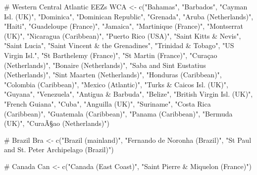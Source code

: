 \documentclass[
]{article}
\newenvironment{Shaded}{\begin{snugshade}}{\end{snugshade}}
\newcommand{\CommentTok}[1]{\textcolor[rgb]{0.37,0.37,0.37}{#1}}
\newcommand{\FunctionTok}[1]{\textcolor[rgb]{0.28,0.35,0.67}{#1}}
\newcommand{\NormalTok}[1]{\textcolor[rgb]{0.00,0.23,0.31}{#1}}
\newcommand{\OtherTok}[1]{\textcolor[rgb]{0.00,0.23,0.31}{#1}}
\newcommand{\StringTok}[1]{\textcolor[rgb]{0.13,0.47,0.30}{#1}}
\begin{document}
\begin{Shaded}
\begin{Highlighting}[]
\CommentTok{\# Western Central Atlantic EEZs}
\NormalTok{WCA }\OtherTok{\textless{}{-}} \FunctionTok{c}\NormalTok{(}\StringTok{"Bahamas"}\NormalTok{, }\StringTok{"Barbados"}\NormalTok{, }\StringTok{"Cayman Isl. (UK)"}\NormalTok{, }\StringTok{"Dominica"}\NormalTok{, }\StringTok{"Dominican Republic"}\NormalTok{, }\StringTok{"Grenada"}\NormalTok{, }
         \StringTok{"Aruba (Netherlands)"}\NormalTok{, }\StringTok{"Haiti"}\NormalTok{, }\StringTok{"Guadeloupe  (France)"}\NormalTok{, }\StringTok{"Jamaica"}\NormalTok{, }\StringTok{"Martinique (France)"}\NormalTok{,}
         \StringTok{"Montserrat (UK)"}\NormalTok{, }\StringTok{"Nicaragua (Caribbean)"}\NormalTok{, }\StringTok{"Puerto Rico (USA)"}\NormalTok{, }\StringTok{"Saint Kitts \& Nevis"}\NormalTok{, }
         \StringTok{"Saint Lucia"}\NormalTok{, }\StringTok{"Saint Vincent \& the Grenadines"}\NormalTok{, }\StringTok{"Trinidad \& Tobago"}\NormalTok{, }\StringTok{"US Virgin Isl."}\NormalTok{, }
         \StringTok{"St Barthelemy (France)"}\NormalTok{, }\StringTok{"St Martin (France)"}\NormalTok{, }\StringTok{"Curaçao (Netherlands)"}\NormalTok{, }\StringTok{"Bonaire (Netherlands)"}\NormalTok{,}
         \StringTok{"Saba and Sint Eustatius (Netherlands)"}\NormalTok{, }\StringTok{"Sint Maarten (Netherlands)"}\NormalTok{, }\StringTok{"Honduras (Caribbean)"}\NormalTok{,}
         \StringTok{"Colombia (Caribbean)"}\NormalTok{, }\StringTok{"Mexico (Atlantic)"}\NormalTok{, }\StringTok{"Turks \& Caicos Isl. (UK)"}\NormalTok{, }\StringTok{"Guyana"}\NormalTok{, }\StringTok{"Venezuela"}\NormalTok{,}
         \StringTok{"Antigua \& Barbuda"}\NormalTok{, }\StringTok{"Belize"}\NormalTok{, }\StringTok{"British Virgin Isl. (UK)"}\NormalTok{, }\StringTok{"French Guiana"}\NormalTok{, }\StringTok{"Cuba"}\NormalTok{, }
         \StringTok{"Anguilla (UK)"}\NormalTok{, }\StringTok{"Suriname"}\NormalTok{, }\StringTok{"Costa Rica (Caribbean)"}\NormalTok{, }\StringTok{"Guatemala (Caribbean)"}\NormalTok{, }
         \StringTok{"Panama (Caribbean)"}\NormalTok{, }\StringTok{"Bermuda (UK)"}\NormalTok{, }\StringTok{"CuraÃ§ao (Netherlands)"}\NormalTok{) }
           
\CommentTok{\# Brazil}
\NormalTok{Bra }\OtherTok{\textless{}{-}} \FunctionTok{c}\NormalTok{(}\StringTok{"Brazil (mainland)"}\NormalTok{, }\StringTok{"Fernando de Noronha (Brazil)"}\NormalTok{, }
         \StringTok{"St Paul and St. Peter Archipelago (Brazil)"}\NormalTok{)}

\CommentTok{\# Canada}
\NormalTok{Can }\OtherTok{\textless{}{-}}  \FunctionTok{c}\NormalTok{(}\StringTok{"Canada (East Coast)"}\NormalTok{, }\StringTok{"Saint Pierre \& Miquelon (France)"}\NormalTok{)}


\end{Highlighting}
\end{Shaded}
\end{document}
